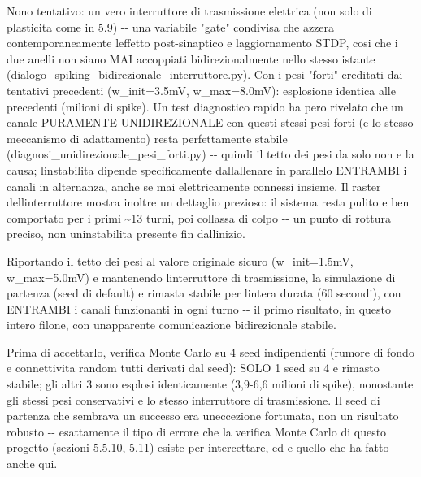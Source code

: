 \documentclass[
  italian,
]{article}
\begin{document}
Nono tentativo: un vero interruttore di trasmissione elettrica (non solo di plasticita\textquotesingle{} come in 5.9) -\/- una variabile "gate" condivisa che azzera contemporaneamente l\textquotesingle effetto post-sinaptico e l\textquotesingle aggiornamento STDP, cosi\textquotesingle{} che i due anelli non siano MAI accoppiati bidirezionalmente nello stesso istante (dialogo\_\allowbreak{}spiking\_\allowbreak{}bidirezionale\_\allowbreak{}interruttore.py). Con i pesi "forti" ereditati dai tentativi precedenti (w\_\allowbreak{}init=3.5mV, w\_\allowbreak{}max=8.0mV): esplosione identica alle precedenti (milioni di spike). Un test diagnostico rapido ha pero\textquotesingle{} rivelato che un canale PURAMENTE UNIDIREZIONALE con questi stessi pesi forti (e lo stesso meccanismo di adattamento) resta perfettamente stabile (diagnosi\_\allowbreak{}unidirezionale\_\allowbreak{}pesi\_\allowbreak{}forti.py) -\/- quindi il tetto dei pesi da solo non e\textquotesingle{} la causa; l\textquotesingle instabilita\textquotesingle{} dipende specificamente dall\textquotesingle allenare in parallelo ENTRAMBI i canali in alternanza, anche se mai elettricamente connessi insieme. Il raster dell\textquotesingle interruttore mostra inoltre un dettaglio prezioso: il sistema resta pulito e ben comportato per i primi \textasciitilde13 turni, poi collassa di colpo -\/- un punto di rottura preciso, non un\textquotesingle instabilita\textquotesingle{} presente fin dall\textquotesingle inizio.

Riportando il tetto dei pesi al valore originale sicuro (w\_\allowbreak{}init=1.5mV, w\_\allowbreak{}max=5.0mV) e mantenendo l\textquotesingle interruttore di trasmissione, la simulazione di partenza (seed di default) e\textquotesingle{} rimasta stabile per l\textquotesingle intera durata (60 secondi), con ENTRAMBI i canali funzionanti in ogni turno -\/- il primo risultato, in questo intero filone, con un\textquotesingle apparente comunicazione bidirezionale stabile.

Prima di accettarlo, verifica Monte Carlo su 4 seed indipendenti (rumore di fondo e connettivita\textquotesingle{} random tutti derivati dal seed): SOLO 1 seed su 4 e\textquotesingle{} rimasto stabile; gli altri 3 sono esplosi identicamente (3,9-6,6 milioni di spike), nonostante gli stessi pesi conservativi e lo stesso interruttore di trasmissione. Il seed di partenza che sembrava un successo era un\textquotesingle eccezione fortunata, non un risultato robusto -\/- esattamente il tipo di errore che la verifica Monte Carlo di questo progetto (sezioni 5.5.10, 5.11) esiste per intercettare, ed e\textquotesingle{} quello che ha fatto anche qui.
\end{document}
